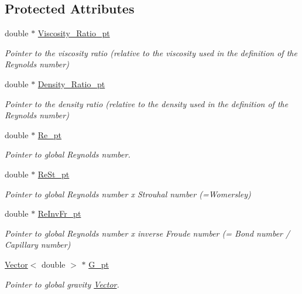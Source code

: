 \subsection*{Protected Attributes}
\begin{DoxyCompactItemize}
\item 
double $\ast$ \hyperlink{classoomph_1_1NavierStokesEquations_a02b887cb89971e92016bddc89f6bfe7f}{Viscosity\+\_\+\+Ratio\+\_\+pt}
\begin{DoxyCompactList}\small\item\em Pointer to the viscosity ratio (relative to the viscosity used in the definition of the Reynolds number) \end{DoxyCompactList}\item 
double $\ast$ \hyperlink{classoomph_1_1NavierStokesEquations_acc13af61f61d5cb36312ccabcdb512a3}{Density\+\_\+\+Ratio\+\_\+pt}
\begin{DoxyCompactList}\small\item\em Pointer to the density ratio (relative to the density used in the definition of the Reynolds number) \end{DoxyCompactList}\item 
double $\ast$ \hyperlink{classoomph_1_1NavierStokesEquations_a18ddee25e3db492aecb447cb1b8867a8}{Re\+\_\+pt}
\begin{DoxyCompactList}\small\item\em Pointer to global Reynolds number. \end{DoxyCompactList}\item 
double $\ast$ \hyperlink{classoomph_1_1NavierStokesEquations_ae60f8d524311d86b8a0ad05d01a01915}{Re\+St\+\_\+pt}
\begin{DoxyCompactList}\small\item\em Pointer to global Reynolds number x Strouhal number (=Womersley) \end{DoxyCompactList}\item 
double $\ast$ \hyperlink{classoomph_1_1NavierStokesEquations_ab09af9227732cacca090a4bd8c4be177}{Re\+Inv\+Fr\+\_\+pt}
\begin{DoxyCompactList}\small\item\em Pointer to global Reynolds number x inverse Froude number (= Bond number / Capillary number) \end{DoxyCompactList}\item 
\hyperlink{classoomph_1_1Vector}{Vector}$<$ double $>$ $\ast$ \hyperlink{classoomph_1_1NavierStokesEquations_aa5ace66d6342862c6d6f4df4862acd0c}{G\+\_\+pt}
\begin{DoxyCompactList}\small\item\em Pointer to global gravity \hyperlink{classoomph_1_1Vector}{Vector}. \end{DoxyCompactList}\item 

\end{DoxyCompactItemize}
